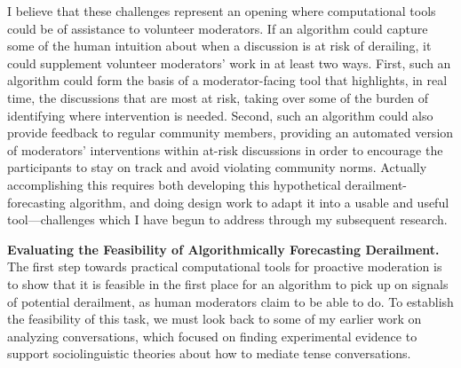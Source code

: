 \documentclass[11pt,letterpaper]{article}
\renewcommand{\section}[1]{\vspace{0.25\baselineskip}\noindent\textbf{#1.}}
\begin{document}
I believe that these challenges represent an opening where computational tools could be of assistance to volunteer moderators.
If an algorithm could capture some of the human intuition about when a discussion is at risk of derailing, it could supplement volunteer moderators' work in at least two ways.
First, such an algorithm could form the basis of a moderator-facing tool that highlights, in real time, the discussions that are most at risk, taking over some of the burden of identifying where intervention is needed.
Second, such an algorithm could also provide feedback to regular community members, providing an automated version of moderators' interventions within at-risk discussions in order to encourage the participants to stay on track and avoid violating community norms.
Actually accomplishing this requires both developing this hypothetical derailment-forecasting algorithm, and doing design work to adapt it into a usable and useful tool---challenges which I have begun to address through my subsequent research.

\section{Evaluating the Feasibility of Algorithmically Forecasting Derailment}
The first step towards practical computational tools for proactive moderation is to show that it is feasible in the first place for an algorithm to pick up on signals of potential derailment, as human moderators claim to be able to do.
To establish the feasibility of this task, we must look back to some of my earlier work on analyzing conversations, which focused on finding experimental evidence to support sociolinguistic theories about how to mediate tense conversations.
\end{document}
